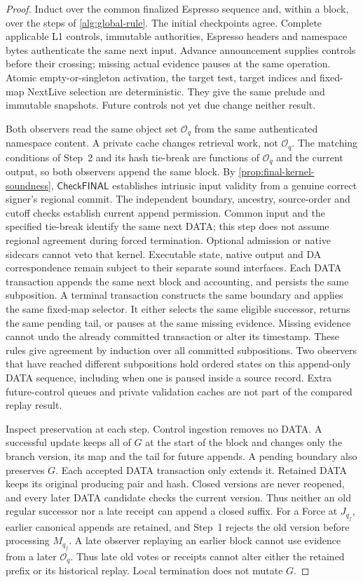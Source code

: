 \documentclass[11pt,a4paper]{article}
\newcommand{\tagg}[1]{\ensuremath{\mathsf{#1}}}
\begin{document}
\begin{proof}
Induct over the common finalized Espresso sequence and, within a block,
over the steps of \cref{alg:global-rule}.
The initial checkpoints agree. Complete applicable L1 controls,
immutable authorities, Espresso headers and namespace bytes authenticate
the same next input. Advance announcement supplies controls before their
crossing; missing actual evidence pauses at the same operation. Atomic
empty-or-singleton activation, the target test, target indices and fixed-map
NextLive selection are deterministic. They give the same prelude and
immutable snapshots. Future controls not yet due change neither result.

Both observers read the same object set $\mathcal O_q$ from the same
authenticated namespace content. A private cache changes retrieval work,
not $\mathcal O_q$. The matching conditions of Step~2 and its hash tie-break are
functions of $\mathcal O_q$ and the current output, so both observers
append the same block. By \cref{prop:final-kernel-soundness},
\tagg{CheckFINAL} establishes intrinsic input validity from a genuine
correct signer's regional commit. The independent boundary, ancestry,
source-order and cutoff checks establish current append permission.
Common input and the specified tie-break identify the same next DATA;
this step does not assume regional agreement during forced termination.
Optional admission or
native sidecars cannot veto that kernel. Executable state, native output
and DA correspondence remain subject to their separate sound interfaces. Each DATA transaction appends the
same next block and accounting, and persists the same subposition.
A terminal transaction constructs the same boundary and applies the same
fixed-map selector. It either selects the same eligible successor, returns
the same pending tail, or pauses at the same missing evidence. Missing evidence
cannot undo the already committed transaction or alter its timestamp.
These rules give agreement by induction over all committed subpositions.
Two observers that have reached different subpositions hold ordered
states on this append-only DATA sequence, including when one is paused
inside a source record. Extra future-control queues and private validation
caches are not part of the compared replay result.

Inspect preservation at each step. Control ingestion removes no DATA. A
successful update keeps all of $G$ at the start of the block and changes
only the branch version, its map and the tail for future appends. A
pending boundary also preserves $G$. Each accepted DATA transaction only extends it. Retained DATA keeps its
original producing pair and hash. Closed versions are never reopened,
and every later DATA candidate checks the current version. Thus
neither an old regular successor nor a late receipt can append a closed
suffix. For a Force at $J_{q_f}$, earlier canonical appends are retained,
and Step~1 rejects the old version before processing $M_{q_f}$.
A late observer replaying an earlier block cannot use evidence from a
later $\mathcal O_q$. Thus late old votes or receipts cannot alter
either the retained prefix or its historical replay. Local termination
does not mutate $G$.
\end{proof}
\end{document}
